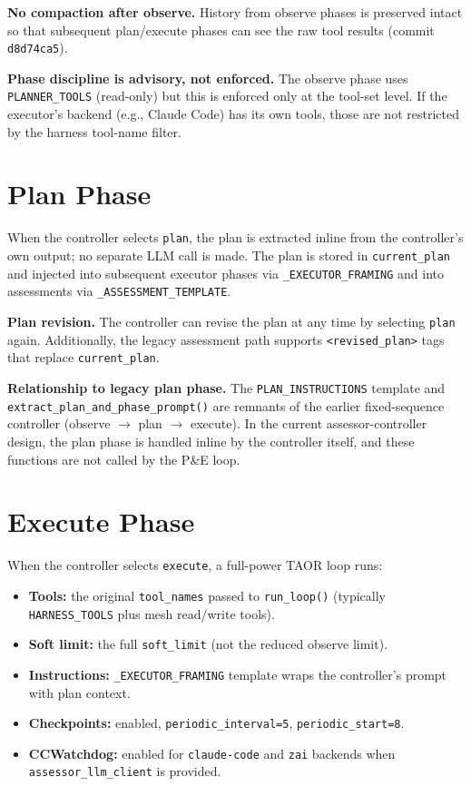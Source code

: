 \documentclass[11pt,letterpaper]{report}
\newcommand{\code}[1]{\texttt{#1}}
\begin{document}
\noindent\textbf{No compaction after observe.}
History from observe phases is preserved intact so that subsequent
plan/execute phases can see the raw tool results
(commit \code{d8d74ca5}).

\noindent\textbf{Phase discipline is advisory, not enforced.}
The observe phase uses \code{PLANNER\_TOOLS} (read-only) but this is
enforced only at the tool-set level. If the executor's backend (e.g.,
Claude Code) has its own tools, those are not restricted by the harness
tool-name filter.


\section{Plan Phase}
\label{sec:plan}

When the controller selects \code{plan}, the plan is extracted
inline from the controller's own output; no separate LLM call is made.
The plan is stored in \code{current\_plan} and injected into subsequent
executor phases via \code{\_EXECUTOR\_FRAMING} and
into assessments via \code{\_ASSESSMENT\_TEMPLATE}.

\noindent\textbf{Plan revision.}
The controller can revise the plan at any time by selecting
\code{plan} again. Additionally, the legacy assessment path supports
\code{<revised\_plan>} tags that replace \code{current\_plan}.

\noindent\textbf{Relationship to legacy plan phase.}
The \code{PLAN\_INSTRUCTIONS} template and
\code{extract\_plan\_and\_phase\_prompt()} are
remnants of the earlier fixed-sequence controller (observe $\to$ plan
$\to$ execute). In the current assessor-controller design, the plan
phase is handled inline by the controller itself, and these functions are
not called by the P\&E loop.


\section{Execute Phase}
\label{sec:execute}

When the controller selects \code{execute}, a full-power TAOR loop
runs:

\begin{itemize}[nosep]
  \item \textbf{Tools:} the original \code{tool\_names} passed to
        \code{run\_loop()} (typically \code{HARNESS\_TOOLS} plus
        mesh read/write tools).
  \item \textbf{Soft limit:} the full \code{soft\_limit} (not the
        reduced observe limit).
  \item \textbf{Instructions:} \code{\_EXECUTOR\_FRAMING} template
        wraps the controller's prompt with plan context.
  \item \textbf{Checkpoints:} enabled, \code{periodic\_interval=5},
        \code{periodic\_start=8}.
  \item \textbf{CCWatchdog:} enabled for \code{claude-code} and
        \code{zai} backends when \code{assessor\_llm\_client} is
        provided.
\end{itemize}
\end{document}
